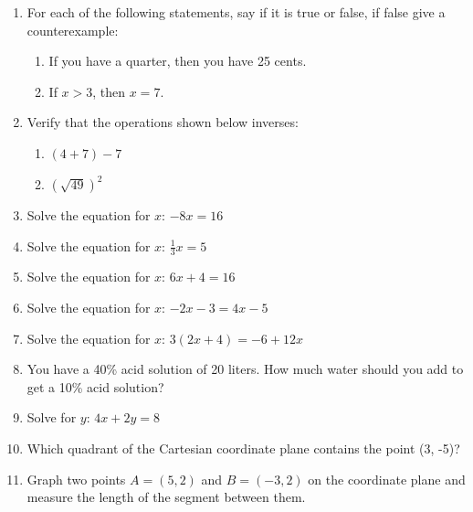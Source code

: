 \documentclass[12pt]{article}
\begin{document}
{}
\begin{enumerate}
\item For each of the following statements, say if it is true or false, if false give a counterexample:
\begin{enumerate}
	\item If you have a quarter, then you have 25 cents.
	\item If $x>3$, then $x = 7$. 
\end{enumerate}

\item Verify that the operations shown below inverses:
\begin{enumerate}
	\item $(4 + 7) - 7$
	\item $\left( \sqrt{49} \right)^2$
\end{enumerate}  

\item Solve the equation for $x$:  $-8x = 16$
\item Solve the equation for $x$: $\frac{1}{3} x = 5$
\item Solve the equation for $x$: $6x + 4 = 16$
\item Solve the equation for $x$: $-2x - 3 = 4x - 5$
\item Solve the equation for $x$: $3(2x + 4) = -6 + 12x$

\item You have a 40\% acid solution of 20 liters. How much water should you add to get a 10\% acid solution?

\item Solve for $y$:  $4x + 2y = 8$

\item Which quadrant of the Cartesian coordinate plane contains the point (3, -5)?

\item  Graph two points $A = (5, 2)$ and $B = (-3, 2)$ on the coordinate plane and measure the length of the segment between them.


\end{enumerate}
\end{document}
